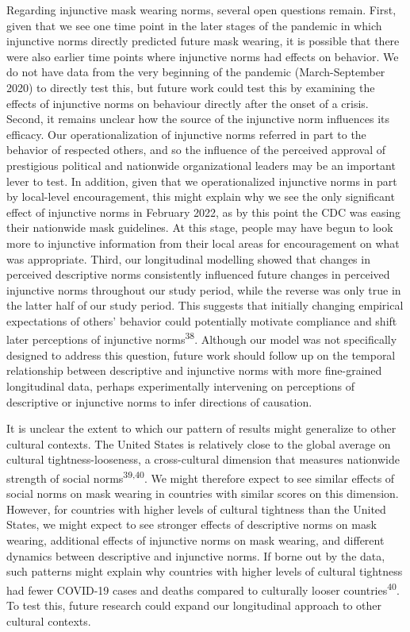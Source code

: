 \documentclass[
  man, donotrepeattitle,floatsintext]{apa6}
\begin{document}
Regarding injunctive mask wearing norms, several open questions remain. First, given that we see one time point in the later stages of the pandemic in which injunctive norms directly predicted future mask wearing, it is possible that there were also earlier time points where injunctive norms had effects on behavior. We do not have data from the very beginning of the pandemic (March-September 2020) to directly test this, but future work could test this by examining the effects of injunctive norms on behaviour directly after the onset of a crisis. Second, it remains unclear how the source of the injunctive norm influences its efficacy. Our operationalization of injunctive norms referred in part to the behavior of respected others, and so the influence of the perceived approval of prestigious political and nationwide organizational leaders may be an important lever to test. In addition, given that we operationalized injunctive norms in part by local-level encouragement, this might explain why we see the only significant effect of injunctive norms in February 2022, as by this point the CDC was easing their nationwide mask guidelines. At this stage, people may have begun to look more to injunctive information from their local areas for encouragement on what was appropriate. Third, our longitudinal modelling showed that changes in perceived descriptive norms consistently influenced future changes in perceived injunctive norms throughout our study period, while the reverse was only true in the latter half of our study period. This suggests that initially changing empirical expectations of others' behavior could potentially motivate compliance and shift later perceptions of injunctive norms\textsuperscript{38}. Although our model was not specifically designed to address this question, future work should follow up on the temporal relationship between descriptive and injunctive norms with more fine-grained longitudinal data, perhaps experimentally intervening on perceptions of descriptive or injunctive norms to infer directions of causation.

It is unclear the extent to which our pattern of results might generalize to other cultural contexts. The United States is relatively close to the global average on cultural tightness-looseness, a cross-cultural dimension that measures nationwide strength of social norms\textsuperscript{39,40}. We might therefore expect to see similar effects of social norms on mask wearing in countries with similar scores on this dimension. However, for countries with higher levels of cultural tightness than the United States, we might expect to see stronger effects of descriptive norms on mask wearing, additional effects of injunctive norms on mask wearing, and different dynamics between descriptive and injunctive norms. If borne out by the data, such patterns might explain why countries with higher levels of cultural tightness had fewer COVID-19 cases and deaths compared to culturally looser countries\textsuperscript{40}. To test this, future research could expand our longitudinal approach to other cultural contexts.
\end{document}

